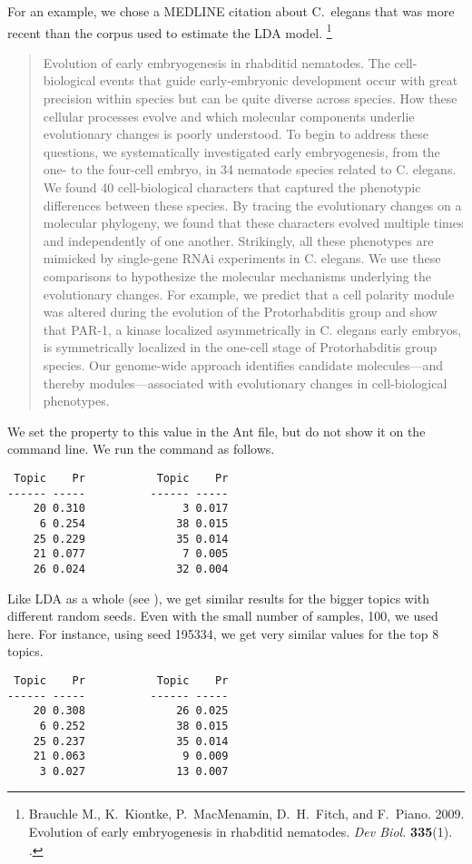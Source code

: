 For an example, we chose a MEDLINE citation about C.~elegans that
was more recent than the corpus used to estimate the LDA model.%
%
\footnote{Brauchle M., K.~Kiontke, P.~MacMenamin, D.~H.~Fitch, and F.~Piano. 2009.
Evolution of early embryogenesis in rhabditid nematodes. {\it Dev Biol.} {\bf 335}(1).
.}
%
\begin{quote}\small
Evolution of early embryogenesis in rhabditid nematodes. The
cell-biological events that guide early-embryonic development occur
with great precision within species but can be quite diverse across
species. How these cellular processes evolve and which molecular
components underlie evolutionary changes is poorly understood. To
begin to address these questions, we systematically investigated early
embryogenesis, from the one- to the four-cell embryo, in 34 nematode
species related to C. elegans. We found 40 cell-biological characters
that captured the phenotypic differences between these species. By
tracing the evolutionary changes on a molecular phylogeny, we found
that these characters evolved multiple times and independently of one
another. Strikingly, all these phenotypes are mimicked by single-gene
RNAi experiments in C. elegans. We use these comparisons to
hypothesize the molecular mechanisms underlying the evolutionary
changes. For example, we predict that a cell polarity module was
altered during the evolution of the Protorhabditis group and show that
PAR-1, a kinase localized asymmetrically in C. elegans early embryos,
is symmetrically localized in the one-cell stage of Protorhabditis
group species. Our genome-wide approach identifies candidate
molecules—and thereby modules—associated with evolutionary changes in
cell-biological phenotypes.
\end{quote}
%

We set the property  to this value in the Ant file, but do
not show it on the command line.  We run the command as follows.
%
\begin{verbatim}
 Topic    Pr           Topic    Pr     
------ -----          ------ -----
    20 0.310               3 0.017
     6 0.254              38 0.015
    25 0.229              35 0.014
    21 0.077               7 0.005
    26 0.024              32 0.004
\end{verbatim}

Like LDA as a whole (see ), we get similar
results for the bigger topics with different random seeds.  Even with
the small number of samples, 100, we used here.  For instance, using
seed 195334, we get very similar values for the top 8 topics.
%
\begin{verbatim}
 Topic    Pr           Topic    Pr     
------ -----          ------ -----
    20 0.308              26 0.025
     6 0.252              38 0.015
    25 0.237              35 0.014
    21 0.063               9 0.009
     3 0.027              13 0.007
\end{verbatim}

